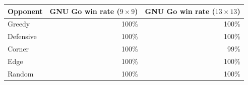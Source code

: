 \begin{table}[t]
  \centering
  \label{tab:gnugo}
  \small
  \begin{tabular}{@{}lrr@{}}
    \toprule
    Opponent   & GNU Go win rate ($9{\times}9$) & GNU Go win rate ($13{\times}13$) \\
    \midrule
    Greedy     & 100\% & 100\% \\
    Defensive  & 100\% & 100\% \\
    Corner     & 100\% & 99\%  \\
    Edge       & 100\% & 100\% \\
    Random     & 100\% & 100\% \\
    \bottomrule
  \end{tabular}
\end{table}
